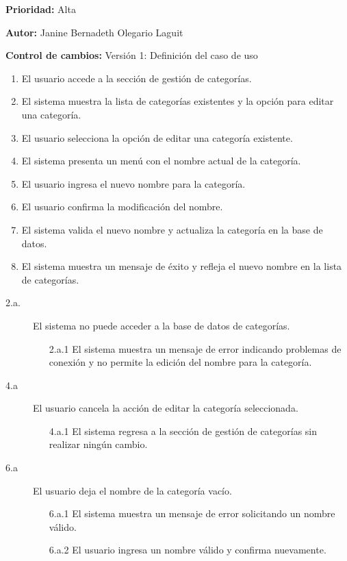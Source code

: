 \textbf{Prioridad: }
Alta
\vspace{0.15cm}

\textbf{Autor: }
Janine Bernadeth Olegario Laguit\par
\vspace{0.15cm}

\textbf{Control de cambios: } Versión 1: Definición del caso de uso

\begin{enumerate}
    \item El usuario accede a la sección de gestión de categorías.
    \item El sistema muestra la lista de categorías existentes y la opción para editar una categoría.
    \item El usuario selecciona la opción de editar una categoría existente.
    \item El sistema presenta un menú con el nombre actual de la categoría.
    \item El usuario ingresa el nuevo nombre para la categoría.
    \item El usuario confirma la modificación del nombre.
    \item El sistema valida el nuevo nombre y actualiza la categoría en la base de datos.
    \item El sistema muestra un mensaje de éxito y refleja el nuevo nombre en la lista de categorías.
\end{enumerate}

\begin{description}
    \item[2.a.] El sistema no puede acceder a la base de datos de categorías.
    \begin{enumerate}
        \item[2.a.1] El sistema muestra un mensaje de error indicando problemas de conexión y no permite la edición del nombre para la categoría.
    \end{enumerate}

    \item[4.a] El usuario cancela la acción de editar la categoría seleccionada.
    \begin{enumerate}
        \item[4.a.1] El sistema regresa a la sección de gestión de categorías sin realizar ningún cambio.
    \end{enumerate}

    \item[6.a] El usuario deja el nombre de la categoría vacío.
    \begin{enumerate}
        \item[6.a.1] El sistema muestra un mensaje de error solicitando un nombre válido.
        \item[6.a.2] El usuario ingresa un nombre válido y confirma nuevamente.
    \end{enumerate}
\end{description}

